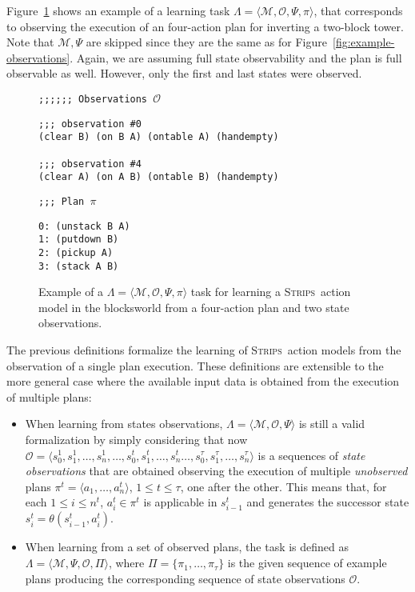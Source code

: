 \documentclass[3p,times]{elsarticle}
\newcommand{\strips}{\textsc{Strips}}     %
\newcommand{\tup}[1]{{\langle #1 \rangle}}
\begin{document}
Figure~\ref{fig:example-plans} shows an example of a learning task $\Lambda=\tup{\mathcal{M},\mathcal{O},\Psi,\pi}$, that corresponds to observing the execution of an four-action plan for inverting a two-block tower. Note that $\mathcal{M},\Psi$ are skipped since they are the same as for Figure~\ref{fig:example-observations}. Again, we are assuming full state observability and the plan is full observable as well. However, only the first and last states were observed.

\begin{figure}[hbt!]
{\footnotesize\tt ;;;;;; Observations $\mathcal{O}$}
\begin{footnotesize}
\begin{verbatim}
;;; observation #0
(clear B) (on B A) (ontable A) (handempty)

;;; observation #4
(clear A) (on A B) (ontable B) (handempty)
\end{verbatim}
\end{footnotesize}
  
{\footnotesize\tt ;;; Plan $\pi$}
\begin{footnotesize}
\begin{verbatim}
0: (unstack B A)
1: (putdown B)
2: (pickup A)
3: (stack A B)
\end{verbatim}
\end{footnotesize}

 \caption{\small Example of a $\Lambda=\tup{\mathcal{M},\mathcal{O},\Psi,\pi}$ task for learning a \strips\ action model in the blocksworld from a four-action plan and two state observations.}
\label{fig:example-plans}
\end{figure}

The previous definitions formalize the learning of \strips\ action models from the observation of a single plan execution. These definitions are extensible to the more general case where the available input data is obtained from the execution of multiple plans:
\begin{itemize}
\item When learning from states observations, $\Lambda=\tup{\mathcal{M},\mathcal{O},\Psi}$ is still a valid formalization by simply considering that now $\mathcal{O}=\tup{s_0^1,s_1^1,\ldots,s_{n}^1,\ldots,s_0^t,s_1^t,\ldots,s_{n}^t\ldots,s_0^{\tau},s_1^{\tau},\ldots,s_{n}^{\tau}}$ is a sequences of {\em state observations} that are obtained observing the execution of multiple {\em unobserved} plans $\pi^t=\tup{a_1, \ldots, a_n^t}$, {\tt\small $1\leq t\leq \tau$}, one after the other. This means that, for each {\small $1\leq i\leq n^t$}, $a_i^t\in \pi^t$ is applicable in $s_{i-1}^t$ and generates the successor state $s_i^t=\theta(s_{i-1}^t,a_i^t)$.
  \item When learning from a set of observed plans, the task is defined as $\Lambda=\tup{\mathcal{M},\Psi,\mathcal{O},\Pi}$, where $\Pi=\{\pi_1,\ldots,\pi_{\tau}\}$ is the given sequence of example plans producing the corresponding sequence of state observations $\mathcal{O}$.
\end{itemize}  
\end{document}
